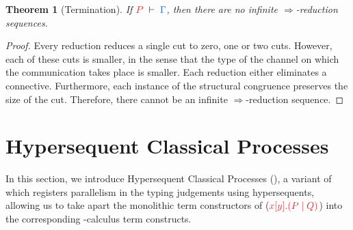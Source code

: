 \documentclass[draft,submission,copyright,creativecommons]{eptcs}
\newtheorem{theorem}{Theorem}
\begin{document}
\begin{theorem}[Termination]\label{thm:cp-termination}
  If $\seq[P]{\Gamma}$, then there are no infinite $\Longrightarrow$-reduction sequences.
\end{theorem}\vspace*{-0.75\baselineskip}%
\begin{proof}
  Every reduction reduces a single cut to zero, one or two cuts. However, each of these cuts is smaller, in the sense that the type of the channel on which the communication takes place is smaller. Each reduction either eliminates a connective. Furthermore, each instance of the structural congruence preserves the size of the cut. Therefore, there cannot be an infinite $\Longrightarrow$-reduction sequence.
\end{proof}


\section{Hypersequent Classical Processes}
\label{sec:hcp}

In this section, we introduce Hypersequent Classical Processes (\hcp), a variant of \cp which registers parallelism in the typing judgements using hypersequents, allowing us to take apart the monolithic term constructors of \cp (\eg $\tm{\cpSend{x}{y}{P}{Q}}$) into the corresponding \textpi-calculus term constructs.
\end{document}
